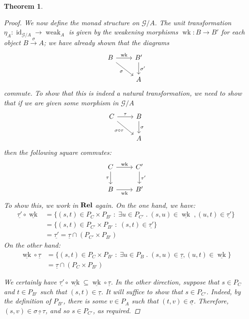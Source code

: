 \documentclass[11pt]{article} %
\theoremstyle{plain} %
\newtheorem{theorem}{Theorem}[section]
\theoremstyle{definition} %
\theoremstyle{exercisestyle}
\newcommand{\catname}[1]{{\normalfont\textbf{#1}}}
\newcommand{\Rel}{\catname{Rel}}
\newcommand{\map}[3]{#2\xrightarrow{#1} #3}
\newcommand*\from{\colon}
\newcommand{\cmap}[3]{#1\from{}#2\to{}#3}
\DeclareMathOperator{\id}{id}
\newcommand{\comp}[2]{#1 \circ #2}
\newcommand{\G}{\mathcal G}
\newcommand{\suchthat}{\;\colon\;}
\newcommand{\esuchthat}{\;.\;}
\DeclareMathOperator{\wk}{wk}
\DeclareMathOperator{\weak}{weak}
\newcommand{\grel}[1]{\underline{#1}}
\begin{document}
\begin{theorem}
\begin{proof}
    We now define the monad structure on $\G/A$.  The unit transformation $\cmap{\eta_A}{\id_{\G/A}}{\weak_A}$ is given by the weakening morphisms $\cmap{\wk}{B}{B'}$ for each object $\map{\sigma}{B}{A}$; we have already shown that the diagrams
    \[
      \begin{tikzcd}
        B \arrow[r, "\wk"] \arrow[dr, "\sigma"']
         & B' \arrow[d, "\sigma'"] \\
         & A
      \end{tikzcd}
      \]
    commute.  To show that this is indeed a natural transformation, we need to show that if we are given some morphism in $\G/A$
    \[
      \begin{tikzcd}
        C \arrow[r, "\tau"] \arrow[dr, "\comp\sigma\tau"']
          & B \arrow[d, "\sigma"] \\
          & A
      \end{tikzcd}
      \]
    then the following square commutes:
    \[
      \begin{tikzcd}
        C \arrow[r, "\wk"] \arrow[d, "\tau"']
          & C' \arrow[d, "\tau'"] \\
        B \arrow[r, "\wk"']
          & B'
      \end{tikzcd}
      \]
    To show this, we work in $\Rel$ again.  On the one hand, we have:
    \begin{align*}
      \comp{\grel{\tau'}}{\grel{\wk}} & = \{(s,t)\in P_C\times P_{B'}\suchthat\exists u\in P_{C'}\esuchthat (s,u)\in\grel\wk\;,(u,t)\in\grel{\tau'}\} \\
       & = \{(s, t)\in P_{C'}\times P_{B'}\suchthat (s,t)\in\grel{\tau'}\} \\
       & = \grel{\tau'} = \grel{\tau}\cap(P_{C'}\times P_{B'})
    \end{align*}
    On the other hand:
    \begin{align*}
      \comp{\grel\wk}{\grel\tau} & = \{(s, t)\in P_C\times P_{B'}\suchthat \exists u\in P_B\esuchthat (s,u)\in \grel\tau, (u, t)\in \grel\wk\} \\
       & = \grel\tau \cap (P_C\times P_{B'})
    \end{align*}
    
    We certainly have $\comp{\grel{\tau'}}{\grel\wk}\subseteq\comp{\grel\wk}{\grel\tau}$.  In the other direction, suppose that $s\in P_C$ and $t\in P_{B'}$ such that $(s,t)\in\grel\tau$.  It will suffice to show that $s\in P_{C'}$.  Indeed, by the definition of $P_{B'}$, there is some $v\in P_A$ such that $(t, v)\in\grel\sigma$.  Therefore, $(s, v)\in\grel{\comp{\sigma}{\tau}}$, and so $s\in P_{C'}$, as required.  


\end{proof}
\end{theorem}
\end{document}
